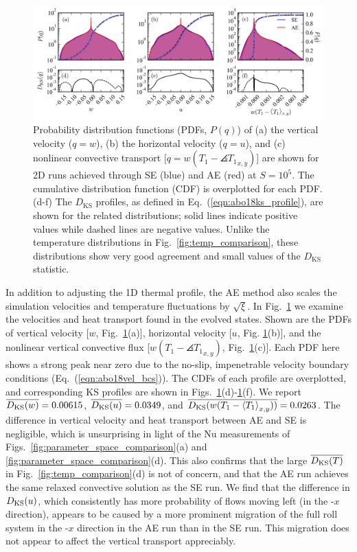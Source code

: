 \begin{figure}[bt!]
\includegraphics[width=\textwidth]{./figs/pdf_comparison.pdf}
\caption[Probability distribution comparison of AE and SE dynamics]
{
	Probability distribution functions (PDFs, $P(q)$) of (a) the vertical velocity ($q = w$), (b) the horizontal velocity ($q = u$), and (c) nonlinear convective transport [$q = w(T_1 - \angles{T_1}_{x,y})$] are shown for 2D runs achieved through SE (blue) and AE (red) at $S = 10^{5}$.  
	The cumulative distribution function (CDF) is overplotted for each PDF. 
	(d-f) The $D_{\text{KS}}$ profiles, as defined in Eq.~(\ref{eqn:abo18ks_profile}), are shown for the related distributions; solid lines indicate positive values while dashed lines are negative values. 
	Unlike the temperature distributions in Fig.~\ref{fig:temp_comparison}, these distributions show very good agreement and small values of the $D_{\text{KS}}$ statistic.
	\label{fig:pdf_comparison} 
}
\end{figure}

In addition to adjusting the 1D thermal profile, the AE method also scales the simulation velocities and temperature fluctuations by $\sqrt{\xi}$. 
In Fig.~\ref{fig:pdf_comparison} we examine the velocities and heat transport found in the evolved states.
Shown are the PDFs of vertical velocity [$w$, Fig.~\ref{fig:pdf_comparison}(a)], horizontal velocity [$u$, Fig. \ref{fig:pdf_comparison}(b)], and the nonlinear vertical convective flux [$w(T_1 - \angles{T_1}_{x,y})$, Fig.~\ref{fig:pdf_comparison}(c)]. 
Each PDF here shows a strong peak near zero due to the no-slip, impenetrable velocity boundary conditions (Eq.~(\ref{eqn:abo18vel_bcs})).
The CDFs of each profile are overplotted, and corresponding KS profiles are shown in Figs.~\ref{fig:pdf_comparison}(d)-\ref{fig:pdf_comparison}(f).  
We report $\overline{D_\text{KS}(w)} = 0.00615$, $\overline{D_\text{KS}(u)} = 0.0349$, and $\overline{D_\text{KS}(w(T_1 - \left\langle T_1 \right\rangle_{x,y}))} = 0.0263$.
The difference in vertical velocity and heat transport between AE and SE is negligible, which is unsurprising in light of the Nu measurements of Figs.~\ref{fig:parameter_space_comparison}(a) and \ref{fig:parameter_space_comparison}(d).
This also confirms that the large $\overline{D_\text{KS}(T)}$ in Fig.~\ref{fig:temp_comparison}(d) is not of concern, and that the AE run achieves the same relaxed convective solution as the SE run.
We find that the difference in $D_{\text{KS}}(u)$, which consistently has more probability of flows moving left (in the -$x$ direction), appears to be caused by a more prominent migration of the full roll system in the -$x$ direction in the AE run than in the SE run. 
This migration does not appear to affect the vertical transport appreciably.


